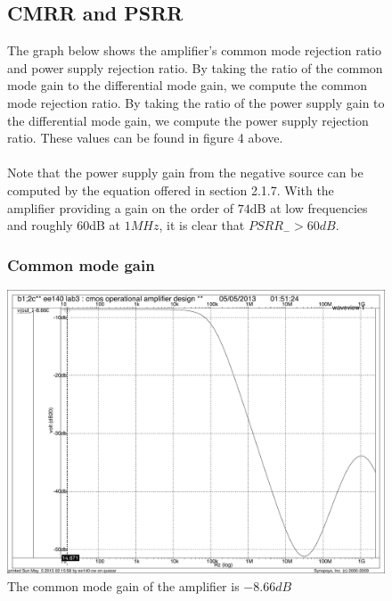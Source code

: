 \documentclass[]{article}
\begin{document}
		\begin{figure}
			\subsection{CMRR and PSRR}
			The graph below shows the amplifier's common mode rejection ratio and power supply rejection ratio. By taking the ratio of the common mode gain to the differential mode gain, we compute the common mode rejection ratio. By taking the ratio of the power supply gain to the differential mode gain, we compute the power supply rejection ratio. These values can be found in figure 4 above.\\
			\\
			Note that the power supply gain from the negative source can be computed by the equation offered in section 2.1.7. With the amplifier providing a gain on the order of $74$dB at low frequencies and roughly $60$dB at $1MHz$, it is clear that $PSRR_{-} > 60dB$.
				\subsubsection{Common mode gain}
				\includegraphics[width=1.1\textwidth]{CMRR_FINAL.pdf}
				\caption{The common mode gain of the amplifier is $-8.66dB$}
		\end{figure}
		
\end{document}
